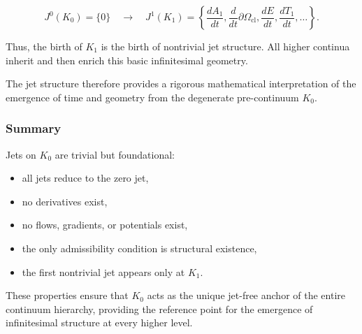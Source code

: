 \begin{equation}
J^0(K_0) = \{0\}
\quad \longrightarrow \quad
J^1(K_1) =
\left\{
\frac{dA_1}{dt},
\frac{d}{dt}\partial\Omega_{\mathrm{cl}},
\frac{dE}{dt},
\frac{dT_1}{dt},
\ldots
\right\}.
\end{equation}

Thus, the birth of $K_1$ is the birth of nontrivial jet structure.
All higher continua inherit and then enrich this basic infinitesimal
geometry.

The jet structure therefore provides a rigorous mathematical
interpretation of the emergence of time and geometry from the degenerate
pre-continuum $K_0$.



\subsubsection{Summary}

Jets on $K_0$ are trivial but foundational:

\begin{itemize}
    \item all jets reduce to the zero jet,
    \item no derivatives exist,
    \item no flows, gradients, or potentials exist,
    \item the only admissibility condition is structural existence,
    \item the first nontrivial jet appears only at $K_1$.
\end{itemize}

These properties ensure that $K_0$ acts as the unique jet-free anchor of
the entire continuum hierarchy, providing the reference point for the
emergence of infinitesimal structure at every higher level.
